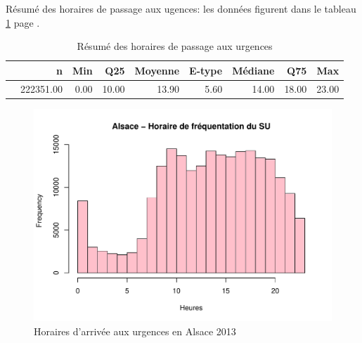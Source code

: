 \documentclass[12pt,english,french,twoside]{report}\usepackage[]{graphicx}\usepackage[]{color}
\makeatletter
\def\maxwidth{ %
  \ifdim\Gin@nat@width>\linewidth
    \linewidth
  \else
    \Gin@nat@width
  \fi
}
\newenvironment{knitrout}{}{} %
\makeatother
\begin{document}
Résumé des horaires de passage aux ugences: les données figurent dans le tableau \ref{tab:24} page \pageref{tab:24}.
\begin{table}[ht]
\centering
\begin{tabular}{rrrrrrrrr}
  \hline
 & n & Min & Q25 & Moyenne & E-type & Médiane & Q75 & Max \\ 
  \hline
 & 222351.00 & 0.00 & 10.00 & 13.90 & 5.60 & 14.00 & 18.00 & 23.00 \\ 
   \hline
\end{tabular}
\caption[horaires de passage]{Résumé des horaires de passage aux urgences} 
\label{tab:24}
\end{table}





\begin{figure}
\begin{center}
\begin{knitrout}
\color{fgcolor}
\includegraphics[width=\maxwidth]{figure/test23} 

\end{knitrout}

\end{center}
\caption{Horaires d'arrivée aux urgences en Alsace 2013}
\label{passage:als}
\end{figure}
\end{document}
